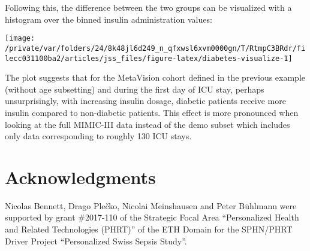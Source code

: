 \documentclass[
  notitle,
  nojss,
  noheadings]{jss}
\begin{document}
\begin{CodeChunk}
\begin{CodeInput}
R> grep_diab <- function(x) {
+   grepl("^250\\.?[0-9]{2}$", x)
+ }
R> 
R> diab  <- item(src, table = "diagnoses_icd",
+               callback = transform_fun(grep_diab),
+               class = "col_itm")
R> 
R> diab  <- concept("diab", diab, "diabetes", target = "id_tbl",
+                  class = "lgl_cncpt")
R> 
R> dat <- load_concepts(c(ins24, diab), id_type = "icustay",
+                      verbose = FALSE)
R> dat <- replace_na(dat, "[0,1)", vars = "ins24")
R> 
R> dat
\end{CodeInput}
\end{CodeChunk}

Following this, the difference between the two groups can be visualized
with a histogram over the binned insulin administration values:

\begin{CodeChunk}


\begin{center}\texttt{[image: /private/var/folders/24/8k48jl6d249\_n\_qfxwsl6xvm0000gn/T/RtmpC3BRdr/filecc031100ba2/articles/jss\_files/figure-latex/diabetes-visualize-1]} \end{center}

\end{CodeChunk}

The plot suggests that for the MetaVision cohort defined in the previous
example (without age subsetting) and during the first day of ICU stay,
perhaps unsurprisingly, with increasing insulin dosage, diabetic
patients receive more insulin compared to non-diabetic patients. This
effect is more pronounced when looking at the full MIMIC-III data
instead of the demo subset which includes only data corresponding to
roughly 130 ICU stays.

\hypertarget{acknowledgments}{%
\section{Acknowledgments}\label{acknowledgments}}

Nicolas Bennett, Drago Plečko, Nicolai Meinshausen and Peter Bühlmann
were supported by grant \#2017-110 of the Strategic Focal Area
``Personalized Health and Related Technologies (PHRT)'' of the ETH
Domain for the SPHN/PHRT Driver Project ``Personalized Swiss Sepsis
Study''.


\end{document}
